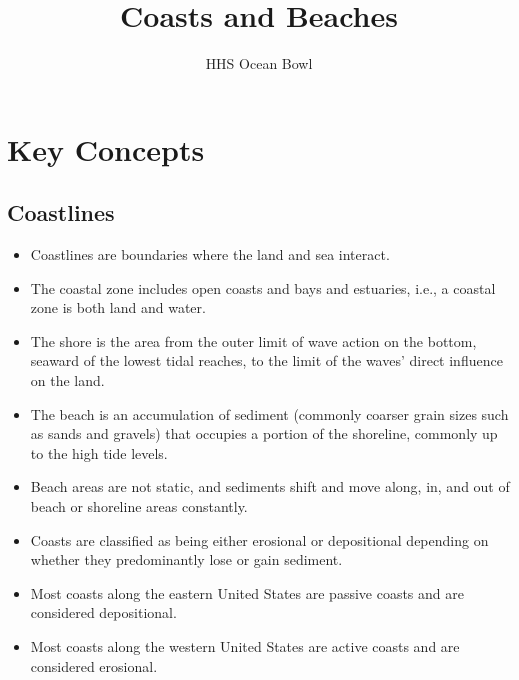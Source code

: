 \documentclass{article}
\begin{document}
\title{Coasts and Beaches}
\author{HHS Ocean Bowl}
\maketitle

\section{Key Concepts}
	\subsection{Coastlines}
	\begin{itemize}
		\item Coastlines are boundaries where the land and sea interact.
		\item The coastal zone includes open coasts and bays and estuaries, i.e., a coastal zone is both land and water.
		\item The shore is the area from the outer limit of wave action on the bottom, seaward of the lowest tidal reaches, to the limit of the waves’ direct influence on the land.
		\item The beach is an accumulation of sediment (commonly coarser grain sizes such as sands and gravels) that occupies a portion of the shoreline, commonly up to the high tide levels.
		\item Beach areas are not static, and sediments shift and move along, in, and out of beach or shoreline areas constantly.
		\item Coasts are classified as being either erosional or depositional depending on whether they predominantly lose or gain sediment.
		\item Most coasts along the eastern United States are passive coasts and are considered depositional.
		\item Most coasts along the western United States are active coasts and are considered erosional.
	\end{itemize}
	
\end{document}
